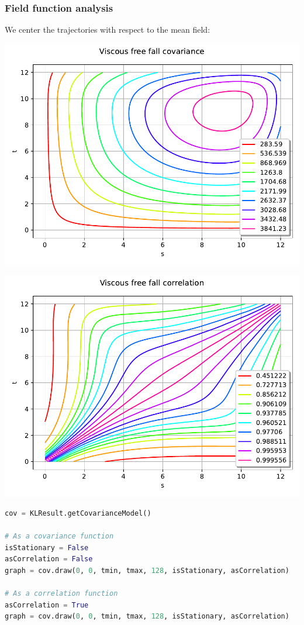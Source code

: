 \documentclass[aspectratio=169]{beamer}
\begin{document}
\begin{frame}[containsverbatim]
\frametitle{Field function analysis}

\scriptsize

We center the trajectories with respect to the mean field:

\begin{minipage}[t]{0.5\textwidth}
    \includegraphics[width=.75\textwidth]{figures/Covariance.pdf}
\end{minipage}%
\begin{minipage}[t]{0.5\textwidth}
    \includegraphics[width=.75\textwidth]{figures/Correlation.pdf}
\end{minipage}


\begin{lstlisting}[language=Python, numbers = none]
cov = KLResult.getCovarianceModel()

# As a covariance function
isStationary = False
asCorrelation = False
graph = cov.draw(0, 0, tmin, tmax, 128, isStationary, asCorrelation)

# As a correlation function
asCorrelation = True
graph = cov.draw(0, 0, tmin, tmax, 128, isStationary, asCorrelation)
\end{lstlisting}
\end{frame}
\end{document}
